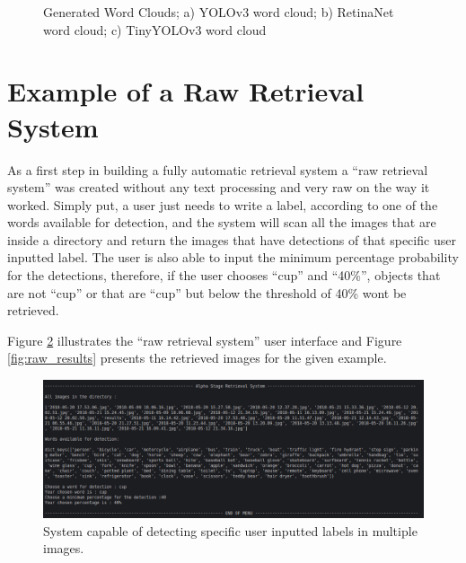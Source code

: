 \begin{figure}[H]
\begin{subfigure}{0.3\textwidth}
      \caption{}
      \end{subfigure}
      \caption[Generated Word Clouds]{Generated Word Clouds; a) YOLOv3 word cloud; b) RetinaNet word cloud; c) TinyYOLOv3 word cloud}
      \label{fig:wordcloudss}
    \end{figure}

    

     

\section{Example of a Raw Retrieval System}
\label{sec:alpha_retrieval}

As a first step in building a fully automatic retrieval system a \enquote{raw retrieval system} was created without any text processing and very raw on the way it worked. Simply put, a user just needs to write a label, according to one of the words available for detection, and the system will scan all the images that are inside a directory and return the images that have detections of that specific user inputted label. The user is also able to input the minimum percentage probability for the detections, therefore, if the user chooses \enquote{cup} and \enquote{40\%}, objects that are not \enquote{cup} or that are \enquote{cup} but below the threshold of 40\% wont be retrieved. 

Figure \ref{fig:raw} illustrates the \enquote{raw retrieval system} user interface and Figure \ref{fig:raw_results} presents the retrieved images for the given example.

\begin{figure}[H]
  \centering
  \includegraphics[width = \textwidth]{Sections/4InitialWork/4_images_random/alpha.png}
  \caption[Raw retrieval system]{System capable of detecting specific user inputted labels in multiple images. }
  \label{fig:raw} 
\end{figure}




